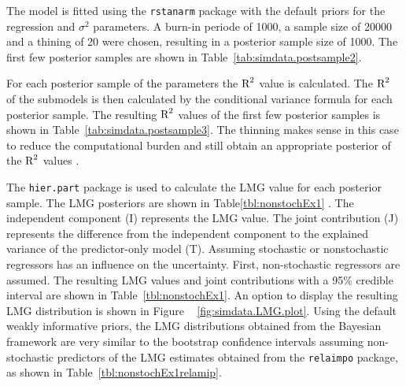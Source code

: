 \documentclass[11pt,a4paper,twoside]{book}\usepackage[]{graphicx}\usepackage[]{color}
\begin{document}
The model is fitted using the \texttt{rstanarm} package \citep{rstanarm} with the default priors for the regression and $\sigma^2$ parameters.  A burn-in periode of 1000, a sample size of 20000 and a thining of 20 were chosen, resulting in a posterior sample size of 1000. The first few posterior samples are shown in Table~\ref{tab:simdata.postsample2}. 

For each posterior sample of the parameters the $\text{R}^2$ value is calculated. The $\text{R}^2$ of the submodels is then calculated by the conditional variance formula for each posterior sample. The resulting $\text{R}^2$ values of the first few posterior samples is shown in Table~\ref{tab:simdata.postsample3}.  The thinning makes sense in this case to reduce the computational burden and still obtain an appropriate posterior of the $\text{R}^2$ values \citep{Link2012}. 

The \texttt{hier.part} package is used to calculate the LMG value for each posterior sample. The LMG posteriors are shown in Table\ref{tbl:nonstochEx1} . The independent component (I) represents the LMG value. The joint contribution (J) represents the difference from the independent component to the explained variance of the predictor-only model (T). Assuming stochastic or nonstochastic regressors has an influence on the uncertainty. First, non-stochastic regressors are assumed. The resulting LMG values and joint contributions with a 95\% credible interval are shown in Table~\ref{tbl:nonstochEx1}. An option to display the resulting LMG distribution is shown in Figure ~ \ref{fig:simdata.LMG.plot}.  Using the default weakly informative priors, the LMG distributions obtained from the Bayesian framework are very similar to the bootstrap confidence intervals assuming non-stochastic predictors of the LMG estimates obtained from the \texttt{relaimpo} package, as shown in Table~\ref{tbl:nonstochEx1relamip}. 
\end{document}
